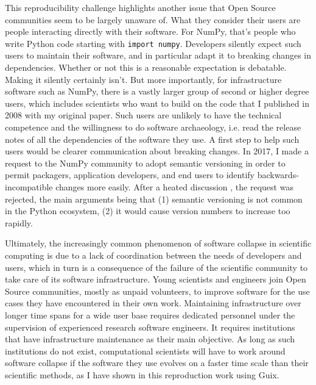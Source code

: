 This reproducibility challenge highlights another issue that Open Source communities seem to be largely unaware of. What they consider their users are people interacting directly with their software. For NumPy, that's people who write Python code starting with \texttt{import numpy}. Developers silently expect such users to maintain their software, and in particular adapt it to breaking changes in dependencies. Whether or not this is a reasonable expectation is debatable. Making it silently certainly isn't. But more importantly, for infrastructure software such as NumPy, there is a vastly larger group of second or higher degree users, which includes scientists who want to build on the code that I published in 2008 with my original paper. Such users are unlikely to have the technical competence and the willingness to do software archaeology, i.e. read the release notes of all the dependencies of the software they use. A first step to help such users would be clearer communication about breaking changes. In 2017, I made a request to the NumPy community to adopt semantic versioning in order to permit packagers, application developers, and end users to identify backwards-incompatible changes more easily. After a heated discussion \cite{NumPydevelopersandusersRequestusesemantic}, the request was rejected, the main arguments being that (1) semantic versioning is not common in the Python ecosystem, (2) it would cause version numbers to increase too rapidly.

\vspace{3mm}

Ultimately, the increasingly common phenomenon of software collapse in scientific computing is due to a lack of coordination between the needs of developers and users, which in turn is a consequence of the failure of the scientific community to take care of its software infrastructure. Young scientists and engineers join Open Source communities, mostly as unpaid volunteers, to improve software for the use cases they have encountered in their own work. Maintaining infrastructure over longer time spans for a wide user base requires dedicated personnel under the supervision of experienced research software engineers. It requires institutions that have infrastructure maintenance as their main objective. As long as such institutions do not exist, computational scientists will have to work around software collapse if the software they use evolves on a faster time scale than their scientific methods, as I have shown in this reproduction work using Guix.
